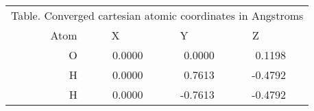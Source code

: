\documentclass{article}%
\begin{document}
\begin{footnotesize}%
\begin{center}%
\begin{longtable}{p{0.5cm}rrrrp{0.5cm}}%
\multicolumn{6}{c}{Table. Converged cartesian atomic coordinates in Angstroms}\\%
&Atom&\multicolumn{1}{c}{X}&\multicolumn{1}{c}{Y}&\multicolumn{1}{c}{Z}&\\%
\hline%
&O&0.0000&0.0000&0.1198&\\%
&H&0.0000&0.7613&{-}0.4792&\\%
&H&0.0000&{-}0.7613&{-}0.4792&\\%
\hline%
\end{longtable}%
\end{center}%
\end{footnotesize}

%
\end{document}

